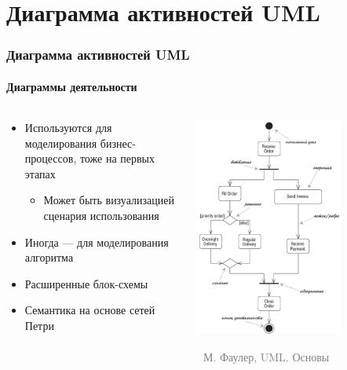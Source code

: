 \documentclass[xetex,mathserif,serif]{beamer}
\newcommand{\attribution}[1] {
	\vspace{-5mm}\begin{flushright}\begin{scriptsize}\textcolor{gray}{\textcopyright\, #1}\end{scriptsize}\end{flushright}
}
\begin{document}
	\section{Диаграмма активностей UML}

	\begin{frame}
		\frametitle{Диаграмма активностей UML}
		\framesubtitle{Диаграммы деятельности}
		\begin{columns}
			\begin{column}{0.5\textwidth}
				\begin{itemize}
					\item Используются для моделирования бизнес-процессов, тоже на первых этапах
					\begin{itemize}
						\item Может быть визуализацией сценария использования
					\end{itemize}
					\item Иногда --- для моделирования алгоритма
					\item Расширенные блок-схемы
					\item Семантика на основе сетей Петри
				\end{itemize}
			\end{column}
			\begin{column}{0.5\textwidth}
				\begin{center}
					\includegraphics[width=0.7\textwidth]{activityDiagram.png}
					\attribution{М. Фаулер, UML. Основы}
				\end{center}
			\end{column}
		\end{columns}
	\end{frame}
\end{document}
